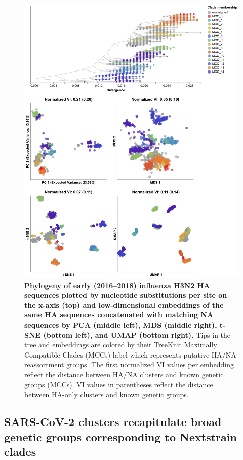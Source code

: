 \documentclass[10pt,letterpaper]{article}
\begin{document}
\begin{figure}[!h]
\includegraphics[width=\columnwidth]{figures/flu-2016-2018-ha-na-embeddings-by-mcc.png}
\caption{{\bf Phylogeny of early (2016--2018) influenza H3N2 HA sequences plotted by nucleotide substitutions per site on the x-axis (top) and low-dimensional embeddings of the same HA sequences concatenated with matching NA sequences by PCA (middle left), MDS (middle right), t-SNE (bottom left), and UMAP (bottom right).}
  Tips in the tree and embeddings are colored by their TreeKnit Maximally Compatible Clades (MCCs) label which represents putative HA/NA reassortment groups.
  The first normalized VI values per embedding reflect the distance between HA/NA clusters and known genetic groups (MCCs).
  VI values in parentheses reflect the distance between HA-only clusters and known genetic groups.
}
\label{fig:seasonal-influenza-h3n2-ha-na-2016-2018-embeddings}
\end{figure}

\subsection*{SARS-CoV-2 clusters recapitulate broad genetic groups corresponding to Nextstrain clades}
\end{document}

